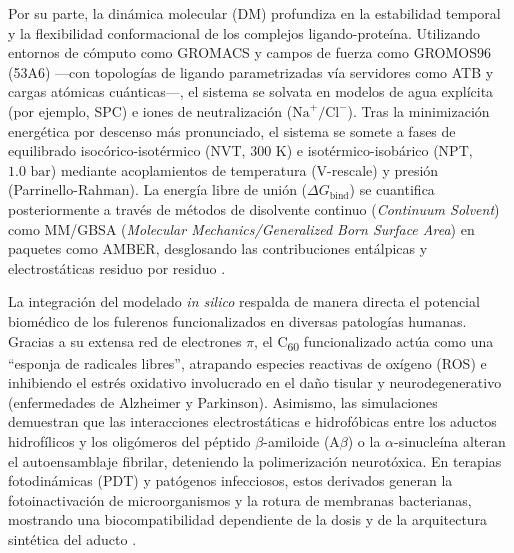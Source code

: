 Por su parte, la dinámica molecular (DM) profundiza en la estabilidad temporal y la flexibilidad conformacional de los complejos ligando-proteína. Utilizando entornos de cómputo como GROMACS y campos de fuerza como GROMOS96 (53A6) —con topologías de ligando parametrizadas vía servidores como ATB y cargas atómicas cuánticas—, el sistema se solvata en modelos de agua explícita (por ejemplo, SPC) e iones de neutralización ($\text{Na}^+/\text{Cl}^-$). Tras la minimización energética por descenso más pronunciado, el sistema se somete a fases de equilibrado isocórico-isotérmico (NVT, $300\text{ K}$) e isotérmico-isobárico (NPT, $1.0\text{ bar}$) mediante acoplamientos de temperatura (V-rescale) y presión (Parrinello-Rahman). La energía libre de unión ($\Delta G_{\text{bind}}$) se cuantifica posteriormente a través de métodos de disolvente continuo (\textit{Continuum Solvent}) como MM/GBSA (\textit{Molecular Mechanics/Generalized Born Surface Area}) en paquetes como AMBER, desglosando las contribuciones entálpicas y electrostáticas residuo por residuo \cite{nelson2022principios, liu2023fullerene}.

La integración del modelado \textit{in silico} respalda de manera directa el potencial biomédico de los fulerenos funcionalizados en diversas patologías humanas. Gracias a su extensa red de electrones $\pi$, el C\textsubscript{60} funcionalizado actúa como una ``esponja de radicales libres'', atrapando especies reactivas de oxígeno (ROS) e inhibiendo el estrés oxidativo involucrado en el daño tisular y neurodegenerativo (enfermedades de Alzheimer y Parkinson). Asimismo, las simulaciones demuestran que las interacciones electrostáticas e hidrofóbicas entre los aductos hidrofílicos y los oligómeros del péptido $\beta$-amiloide ($\text{A}\beta$) o la $\alpha$-sinucleína alteran el autoensamblaje fibrilar, deteniendo la polimerización neurotóxica. En terapias fotodinámicas (PDT) y patógenos infecciosos, estos derivados generan la fotoinactivación de microorganismos y la rotura de membranas bacterianas, mostrando una biocompatibilidad dependiente de la dosis y de la arquitectura sintética del aducto \cite{wilson2024role, wang2024strain,  celaya2022administracion, partha2009biomedical}.
  


















